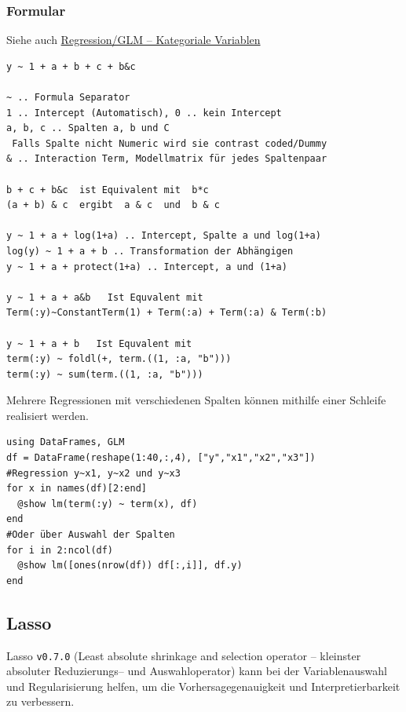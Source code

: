 \documentclass[10pt,twocolumn]{scrartcl}
\begin{document}
\subsubsection{Formular}

Siehe auch \hyperref[ssec:kategorialeVariablen]{Regression/GLM -- Kategoriale
Variablen}

\begin{lstlisting}
y ~ 1 + a + b + c + b&c

~ .. Formula Separator
1 .. Intercept (Automatisch), 0 .. kein Intercept
a, b, c .. Spalten a, b und C
 Falls Spalte nicht Numeric wird sie contrast coded/Dummy
& .. Interaction Term, Modellmatrix für jedes Spaltenpaar

b + c + b&c  ist Equivalent mit  b*c
(a + b) & c  ergibt  a & c  und  b & c

y ~ 1 + a + log(1+a) .. Intercept, Spalte a und log(1+a)
log(y) ~ 1 + a + b .. Transformation der Abhängigen
y ~ 1 + a + protect(1+a) .. Intercept, a und (1+a)

y ~ 1 + a + a&b   Ist Equvalent mit
Term(:y)~ConstantTerm(1) + Term(:a) + Term(:a) & Term(:b)

y ~ 1 + a + b   Ist Equvalent mit
term(:y) ~ foldl(+, term.((1, :a, "b")))
term(:y) ~ sum(term.((1, :a, "b")))
\end{lstlisting}

Mehrere Regressionen mit verschiedenen Spalten können mithilfe einer Schleife
realisiert werden.

\begin{lstlisting}
using DataFrames, GLM
df = DataFrame(reshape(1:40,:,4), ["y","x1","x2","x3"])
#Regression y~x1, y~x2 und y~x3
for x in names(df)[2:end]
  @show lm(term(:y) ~ term(x), df)
end
#Oder über Auswahl der Spalten
for i in 2:ncol(df)
  @show lm([ones(nrow(df)) df[:,i]], df.y)
end
\end{lstlisting}

\subsection{Lasso}

Lasso \lstinline|v0.7.0| (Least absolute shrinkage and selection operator --
kleinster absoluter Reduzierungs-- und Auswahloperator) kann bei der
Variablenauswahl und Regularisierung helfen, um die Vorhersagegenauigkeit und
Interpretierbarkeit zu verbessern.
\end{document}
